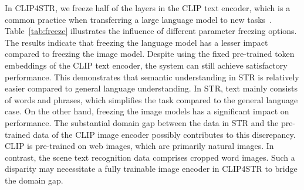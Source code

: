 \documentclass[lettersize,journal]{IEEEtran}
\begin{document}
In CLIP4STR, we freeze half of the layers in the CLIP text encoder, which is a common practice when transferring a large language model to new tasks~\cite{2022_alayrac_flamingo}.
Table~\ref{tab:freeze} illustrates the influence of different parameter freezing options.
The results indicate that freezing the language model has a lesser impact compared to freezing the image model.
Despite using the fixed pre-trained token embeddings of the CLIP text encoder, the system can still achieve satisfactory performance.
This demonstrates that semantic understanding in STR is relatively easier compared to general language understanding.
In STR, text mainly consists of words and phrases, which simplifies the task compared to the general language case.
On the other hand, freezing the image models has a significant impact on performance. The substantial domain gap between the data in STR and the pre-trained data of the CLIP image encoder possibly contributes to this discrepancy.
CLIP is pre-trained on web images, which are primarily natural images.
In contrast, the scene text recognition data comprises cropped word images.
Such a disparity may necessitate a fully trainable image encoder in CLIP4STR to bridge the domain gap.


\begin{table}[!t]
    \centering
    \caption{\textbf{Different pre-training strategies}.
    \#Params means the learnable parameters in the visual encoder.
    For a fair comparison, only the results of the visual branch in CLIP4STR-B are shown.
    }
    \setlength\tabcolsep{3pt}
  \label{tab:pretrained}
\end{table} 
\end{document}
